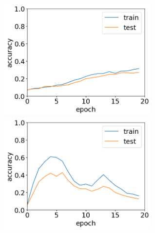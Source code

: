 \documentclass[11pt,a4paper,uplatex]{ujarticle}
\begin{document}
  \begin{figure}[tbp]
    \begin{minipage}[b]{0.5\textwidth}
      \centering
      \includegraphics[keepaspectratio, width=80mm]{Images/python/acc_202402051754.png}
    \end{minipage}
    \begin{minipage}[b]{0.5\textwidth}
      \centering
      \includegraphics[keepaspectratio, width=80mm]{Images/python/acc_202402052233.png}
    \end{minipage}
  \end{figure}
\end{document}
